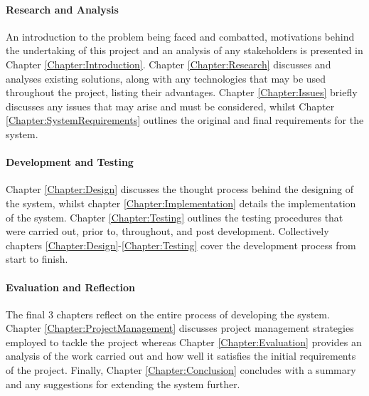 \paragraph{Research and Analysis}
An introduction to the problem being faced and combatted, motivations behind the undertaking of this project and an analysis of any stakeholders is presented in Chapter \ref{Chapter:Introduction}. Chapter \ref{Chapter:Research} discusses and analyses existing solutions, along with any technologies that may be used throughout the project, listing their advantages. Chapter \ref{Chapter:Issues} briefly discusses any issues that may arise and must be considered, whilst Chapter \ref{Chapter:SystemRequirements} outlines the original and final requirements for the system.

\paragraph{Development and Testing}
Chapter \ref{Chapter:Design} discusses the thought process behind the designing of the system, whilst chapter \ref{Chapter:Implementation} details the implementation of the system. Chapter \ref{Chapter:Testing} outlines the testing procedures that were carried out, prior to, throughout, and post development. Collectively chapters \ref{Chapter:Design}-\ref{Chapter:Testing} cover the development process from start to finish.

\paragraph{Evaluation and Reflection}
The final 3 chapters reflect on the entire process of developing the system. Chapter \ref{Chapter:ProjectManagement} discusses project management strategies employed to tackle the project whereas Chapter \ref{Chapter:Evaluation} provides an analysis of the work carried out and how well it satisfies the initial requirements of the project. Finally, Chapter \ref{Chapter:Conclusion} concludes with a summary and any suggestions for extending the system further.
